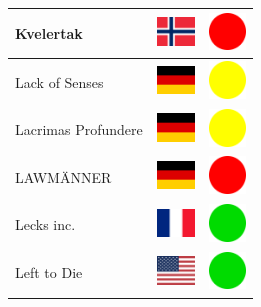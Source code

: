 \documentclass[12pt, a4paper, twoside]{report}
\begin{document}
\begin{center}
\begin{longtable}{|p{5cm}|p{2cm}|p{2cm}|}
 Kvelertak                                                  & \includegraphics[width=1cm]{../4x3/no} &   \includegraphics[width=1cm]{../likes/n} \\ \hline
 Lack of Senses                                             & \includegraphics[width=1cm]{../4x3/de} &   \includegraphics[width=1cm]{../likes/m} \\ \hline
 Lacrimas Profundere                                        & \includegraphics[width=1cm]{../4x3/de} &   \includegraphics[width=1cm]{../likes/m} \\ \hline
 LAWMÄNNER                                                  & \includegraphics[width=1cm]{../4x3/de} &   \includegraphics[width=1cm]{../likes/n} \\ \hline
 Lecks inc.                                                 & \includegraphics[width=1cm]{../4x3/fr} &   \includegraphics[width=1cm]{../likes/y} \\ \hline
 Left to Die                                                & \includegraphics[width=1cm]{../4x3/us} &   \includegraphics[width=1cm]{../likes/y} \\ \hline

\end{longtable}
\end{center}
\end{document}
